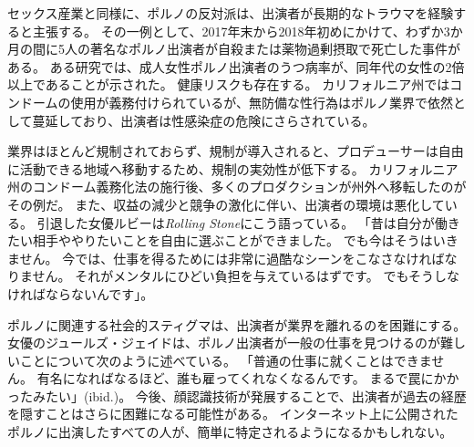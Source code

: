 \documentclass[paper=a4,book,openany]{jlreq}
\newcommand{\ig}[1]{}           %
\begin{document}
セックス産業と同様に、ポルノの反対派は、出演者が長期的なトラウマを経験すると主張する。
その一例として、2017年末から2018年初めにかけて、わずか3か月の間に5人の著名なポルノ出演者が自殺または薬物過剰摂取で死亡した事件がある。
ある研究では、成人女性ポルノ出演者のうつ病率が、同年代の女性の2倍以上であることが示された\citep{grudzen01:_compar_mental_healt_femal_adult}。
健康リスクも存在する。
カリフォルニア州ではコンドームの使用が義務付けられているが、無防備な性行為はポルノ業界で依然として蔓延しており、出演者は性感染症\ig{(STI)}の危険にさらされている\citep{coyne09:_sexual_healt_adult_workin_pornog_films}。

業界はほとんど規制されておらず、規制が導入されると、プロデューサーは自由に活動できる地域へ移動するため、規制の実効性が低下する。
カリフォルニア州のコンドーム義務化法の施行後、多くのプロダクションが州外へ移転したのがその例だ。
また、収益の減少と競争の激化に伴い、出演者の環境は悪化している。
引退した女優ルビーは\emph{Rolling Stone}にこう語っている。
「昔は自分が働きたい相手ややりたいことを自由に選ぶことができました。
でも今はそうはいきません。
今では、仕事を得るためには非常に過酷なシーンをこなさなければなりません。
それがメンタルにひどい負担を与えているはずです。
でもそうしなければならないんです」\citep{swann18:_is_porn_indus_doing_enoug}。

ポルノに関連する社会的スティグマは、出演者が業界を離れるのを困難にする。
女優のジュールズ・ジェイドは、ポルノ出演者が一般の仕事を見つけるのが難しいことについて次のように述べている。
「普通の仕事に就くことはできません。
有名になればなるほど、誰も雇ってくれなくなるんです。
まるで罠にかかったみたい」(ibid.)。
今後、顔認識技術が発展することで、出演者が過去の経歴を隠すことはさらに困難になる可能性がある。
インターネット上に公開されたポルノに出演したすべての人が、簡単に特定されるようになるかもしれない。
\end{document}
